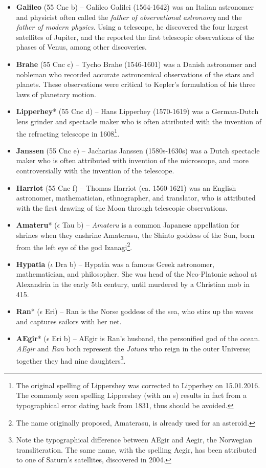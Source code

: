 \begin{itemize}
\item \textbf{Galileo} (55 Cnc b) -- Galileo Galilei (1564-1642) was an Italian astronomer and physicist often called the \textit{father of observational astronomy} and the \textit{father of modern physics}. Using a telescope, he discovered the four largest satellites of Jupiter, and the reported the first telescopic observations of the phases of Venus, among other discoveries.
\item \textbf{Brahe} (55 Cnc c) -- Tycho Brahe (1546-1601) was a Danish astronomer and nobleman who recorded accurate astronomical observations of the stars and planets. These observations were critical to Kepler's formulation of his three laws of planetary motion.
\item \textbf{Lipperhey}* (55 Cnc d) -- Hans Lipperhey (1570-1619) was a German-Dutch lens grinder and spectacle maker who is often attributed with the invention of the refracting telescope in 1608\footnote{The original spelling of Lippershey was corrected to Lipperhey on 15.01.2016. The commonly seen spelling Lippershey (with an s) results in fact from a typographical error dating back from 1831, thus should be avoided.}.
\item \textbf{Janssen} (55 Cnc e) -- Jacharias Janssen (1580s-1630s) was a Dutch spectacle maker who is often attributed with invention of the microscope, and more controversially with the invention of the telescope.
\item \textbf{Harriot} (55 Cnc f) -- Thomas Harriot (ca. 1560-1621) was an English astronomer, mathematician, ethnographer, and translator, who is attributed with the first drawing of the Moon through telescopic observations.
\item \textbf{Amateru}* ($\epsilon$ Tau b) -- \textit{Amateru} is a common Japanese appellation for shrines when they enshrine Amaterasu, the Shinto goddess of the Sun, born from the left eye of the god Izanagi\footnote{The name originally proposed, Amaterasu, is already used for an asteroid.}.
\item \textbf{Hypatia} ($\iota$ Dra b) -- Hypatia was a famous Greek astronomer, mathematician, and philosopher. She was head of the Neo-Platonic school at Alexandria in the early 5th century, until murdered by a Christian mob in 415.
\item \textbf{Ran}* ($\epsilon$ Eri) -- Ran is the Norse goddess of the sea, who stirs up the waves and captures sailors with her net.
\item \textbf{AEgir}* ($\epsilon$ Eri b) -- AEgir is Ran's husband, the personified god of the ocean. \textit{AEgir} and \textit{Ran} both represent the \textit{Jotuns} who reign in the outer Universe; together they had nine daughters\footnote{Note the typographical difference between AEgir and Aegir, the Norwegian transliteration. The same name, with the spelling Aegir, has been attributed to one of Saturn's satellites, discovered in 2004.}.

\end{itemize}
